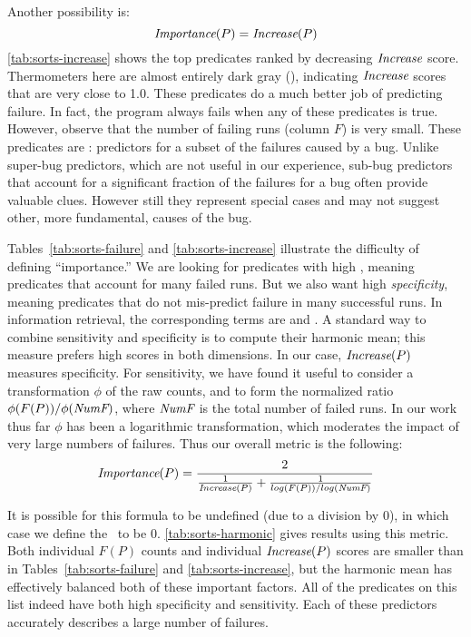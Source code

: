 Another possibility is:
\[ \textit{Importance}(P) = \textit{Increase}(P) \]
\autoref{tab:sorts-increase} shows the top predicates ranked by
decreasing $\textit{Increase}$ score.  Thermometers here are almost entirely
dark gray (), indicating $\textit{Increase}$ scores that are very
close to 1.0.  These predicates do a much better job of predicting
failure.  In fact, the program always fails when any of these
predicates is true.  However, observe that the number of failing runs
(column $F$) is very small.  These predicates are : predictors for a subset of the failures caused by a
bug.  Unlike super-bug predictors, which are not useful in our
experience, sub-bug predictors that account for a significant fraction
of the failures for a bug often provide valuable clues.  However still
they represent special cases and may not suggest other, more
fundamental, causes of the bug.

Tables~\ref{tab:sorts-failure} and \ref{tab:sorts-increase} illustrate
the difficulty of defining ``importance.''  We are looking for
predicates with high , meaning predicates that
account for many failed runs.  But we also want high
\emph{specificity}, meaning predicates that do not mis-predict failure
in many successful runs.  In information retrieval, the corresponding
terms are  and .  A standard way to combine sensitivity
and specificity is to compute their harmonic mean; this measure
prefers high scores in both dimensions.  In our case, $\textit{Increase}(P)$
measures specificity.  For sensitivity, we have found it useful to
consider a transformation $\phi$ of the raw counts, and to form the
normalized ratio $\phi(F(P)) / \phi(\textit{NumF})$, where $\textit{NumF}$ is
the total number of failed runs.  In our work thus far $\phi$ has been
a logarithmic transformation, which moderates the impact of very large
numbers of failures.  Thus our overall metric is the following:
\[
\textit{Importance}(P) =
\frac{2}{
  \frac{1}{\textit{Increase}(P)}
  +
  \frac{1}{log(F(P)) / log(\textit{NumF})}}
\]

It is possible for this formula to be undefined (due to a division by 0),
in which case we define the \importance\ to be 0.
\autoref{tab:sorts-harmonic} gives results using this metric.
Both individual $F(P)$ counts and individual $\textit{Increase}(P)$ scores are smaller than in
Tables~\ref{tab:sorts-failure} and \ref{tab:sorts-increase}, but the harmonic mean
has effectively balanced both of these important factors.  All of the
predicates on this list indeed have both high specificity and
sensitivity.  Each of these predictors accurately describes a large
number of failures.

